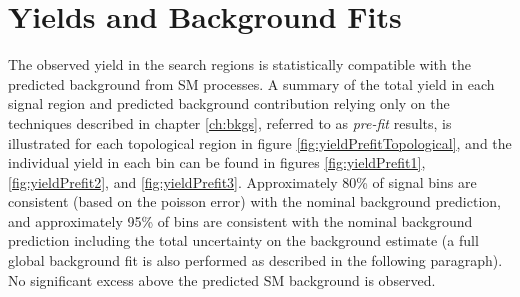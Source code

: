 \section{Yields and Background Fits}
\label{sec:yields}

The observed yield in the search regions is statistically compatible with the predicted background from SM processes. A summary of the total yield in each signal region and predicted background contribution relying only on the techniques described in chapter \ref{ch:bkgs}, referred to as {\it pre-fit} results, is illustrated for each topological region in figure \ref{fig:yieldPrefitTopological}, and the individual yield in each \mttwo bin can be found in figures \ref{fig:yieldPrefit1}, \ref{fig:yieldPrefit2}, and \ref{fig:yieldPrefit3}. Approximately 80\% of signal bins are consistent (based on the poisson error) with the nominal background prediction, and approximately 95\% of bins are consistent with the nominal background prediction including the total uncertainty on the background estimate (a full global background fit is also performed as described in the following paragraph). No significant excess above the predicted SM background is observed.

